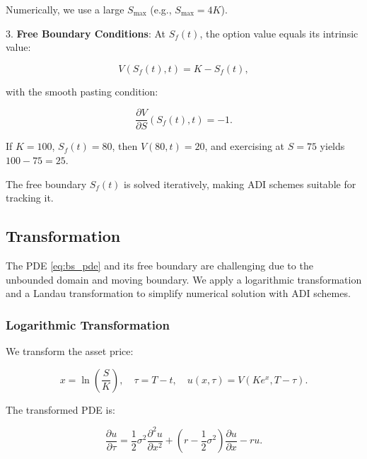 \documentclass{article}
\begin{document}
   Numerically, we use a large \( S_{\max} \) (e.g., \( S_{\max} = 4K \)).

3. \textbf{Free Boundary Conditions}:
   At \( S_f(t) \), the option value equals its intrinsic value:

   \begin{equation}
   V(S_f(t), t) = K - S_f(t),
   \label{eq:free_boundary_value}
   \end{equation}

   with the smooth pasting condition:

   \begin{equation}
   \frac{\partial V}{\partial S}(S_f(t), t) = -1.
   \label{eq:smooth_pasting}
   \end{equation}

   If \( K = 100 \), \( S_f(t) = 80 \), then \( V(80, t) = 20 \), and exercising at \( S = 75 \) yields \( 100 - 75 = 25 \).

\begin{remark}
The free boundary \( S_f(t) \) is solved iteratively, making ADI schemes suitable for tracking it.
\end{remark}

\subsection{Transformation}
The PDE \eqref{eq:bs_pde} and its free boundary are challenging due to the unbounded domain and moving boundary. We apply a logarithmic transformation and a Landau transformation to simplify numerical solution with ADI schemes.

\subsubsection{Logarithmic Transformation}
We transform the asset price:

\begin{equation}
x = \ln \left( \frac{S}{K} \right), \quad \tau = T - t, \quad u(x, \tau) = V(K e^x, T - \tau).
\label{eq:log_transform}
\end{equation}

The transformed PDE is:

\begin{equation}
\frac{\partial u}{\partial \tau} = \frac{1}{2} \sigma^2 \frac{\partial^2 u}{\partial x^2} + \left( r - \frac{1}{2} \sigma^2 \right) \frac{\partial u}{\partial x} - r u.
\label{eq:transformed_pde}
\end{equation}
\end{document}
